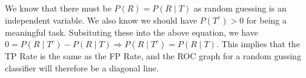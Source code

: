 \documentclass[12pt]{article}
\begin{document}
We know that there must be $P(R) = P(R \mid T)$ as random guessing is an independent variable. We also know we should have $P(T^c) > 0$ for being a meaningful task. Subsituting these into the above equation, we have $0 = P(R \mid T^c) -  P(R \mid T) \Longrightarrow  P(R \mid T^c) = P(R \mid T)$. This implies that the TP Rate is the same as the FP Rate, and the ROC graph for a random gussing classifier will therefore be a diagonal line.


% 
% 
\end{document}
